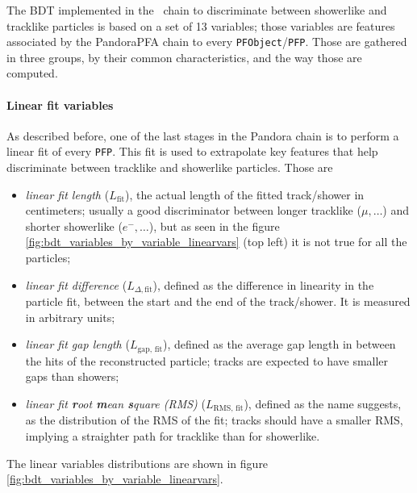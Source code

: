 The BDT implemented in the \pandosmic\ chain to discriminate between showerlike and tracklike particles is based on a set of 13 variables; those variables are features associated by the PandoraPFA chain to every \texttt{PFObject}/\texttt{PFP}. Those are gathered in three groups, by their common characteristics, and the way those are computed. 

\paragraph*{Linear fit variables} As described before, one of the last stages in the Pandora chain is to perform a linear fit of every \texttt{PFP}. This fit is used to extrapolate key features that help discriminate between tracklike and showerlike particles. Those are \begin{itemize}
    \item \emph{linear fit length} ($L_\text{fit}$), the actual length of the fitted track/shower in centimeters; usually a good discriminator between longer tracklike ($\mu, \dots$) and shorter showerlike ($e^-,\dots$), but as seen in the figure \ref{fig:bdt_variables_by_variable_linearvars} (top left) it is not true for all the particles;
    \item \emph{linear fit difference} ($L_{\Delta, \text{fit}}$), defined as the difference in linearity in the particle fit, between the start and the end of the track/shower. It is measured in arbitrary units;
    \item \emph{linear fit gap length} ($L_{\text{gap, fit}}$), defined as the average gap length in between the hits of the reconstructed particle; tracks are expected to have smaller gaps than showers;
    \item \emph{linear fit \textbf{r}oot \textbf{m}ean \textbf{s}quare (RMS)} ($L_{\text{RMS, fit}}$), defined as the name suggests, as the distribution of the RMS of the fit; tracks should have a smaller RMS, implying a straighter path for tracklike than for showerlike. 
\end{itemize} The linear variables distributions are shown in figure \ref{fig:bdt_variables_by_variable_linearvars}.

